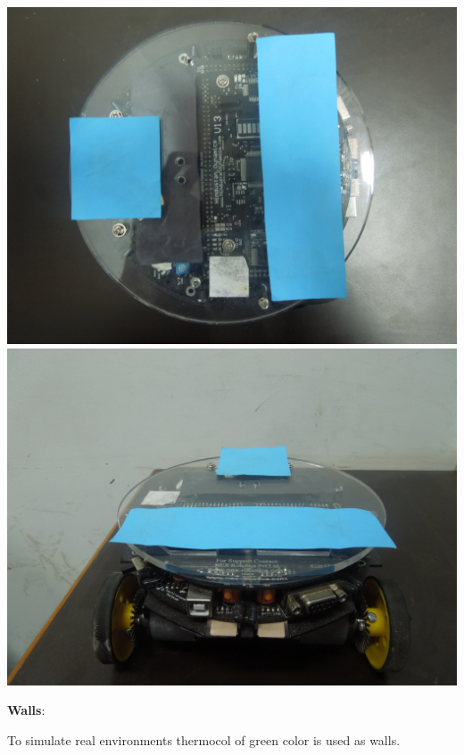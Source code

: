 \documentclass[report]{res}
\begin{document}
	\begin{center}
		\includegraphics[scale = 0.05]{graphics/pics/DSCN0039.jpg}
		\includegraphics[scale = 0.05]{graphics/pics/DSCN0040.jpg} \\
	\end{center}
	
	\pagebreak
	
	
	\textbf{Walls}:
	
	To simulate real environments thermocol of green color is used as walls.\\
	
\end{document}
